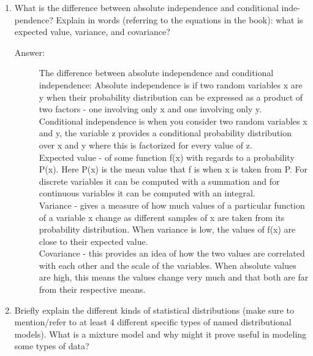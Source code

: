 \documentclass[12pt]{article}
\begin{document}
\begin{enumerate}
  \item What is the difference between absolute independence and conditional inde-
pendence? Explain in words (referring to the equations in the book): what is expected value,
variance, and covariance?
\begin{description}
 \item[Answer:]The difference between absolute independence and conditional independence:
Absolute independence is if two random variables x are y when their probability distribution can be expressed as a product of two factors - one involving only x and one involving only y.\\

Conditional independence is when you consider two random variables x and y, the variable z provides a conditional probability distribution over x and y where this is factorized for every value of z.\\

Expected value - of some function f(x) with regards to a probability P(x). Here P(x) is the mean value that f is when x is taken from P. For discrete variables it can be computed with a summation and for continuous variables it can be computed with an integral.\\

Variance - gives a measure of how much values of a particular function of a variable x change as different samples of x are taken from its probability distribution. When variance is low, the values of f(x) are close to their expected value. \\

Covariance - this provides an idea of how the two values are correlated with each other and the scale of the variables. When absolute values are high, this means the values change very much and that both are far from their respective means.\\

\end{description}
  \item Briefly explain the different kinds of statistical distributions (make sure to
mention/refer to at least 4 different specific types of named distributional models). What is a mixture model and why might it prove useful in modeling some types of data?


\end{enumerate}
\end{document}
